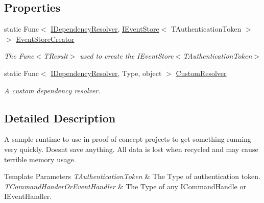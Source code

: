 \subsection*{Properties}
\begin{DoxyCompactItemize}
\item 
static Func$<$ \hyperlink{interfaceCqrs_1_1Configuration_1_1IDependencyResolver}{I\+Dependency\+Resolver}, \hyperlink{interfaceCqrs_1_1Events_1_1IEventStore}{I\+Event\+Store}$<$ T\+Authentication\+Token $>$ $>$ \hyperlink{classCqrs_1_1Configuration_1_1SampleRuntime_a9038dd478bcafb2f5f65cbcbada712db_a9038dd478bcafb2f5f65cbcbada712db}{Event\+Store\+Creator}
\begin{DoxyCompactList}\small\item\em The Func$<$\+T\+Result$>$ used to create the I\+Event\+Store$<$\+T\+Authentication\+Token$>$ \end{DoxyCompactList}\item 
static Func$<$ \hyperlink{interfaceCqrs_1_1Configuration_1_1IDependencyResolver}{I\+Dependency\+Resolver}, Type, object $>$ \hyperlink{classCqrs_1_1Configuration_1_1SampleRuntime_abf9adc15d9a99c70ab60792c37a619f0_abf9adc15d9a99c70ab60792c37a619f0}{Custom\+Resolver}
\begin{DoxyCompactList}\small\item\em A custom dependency resolver. \end{DoxyCompactList}\end{DoxyCompactItemize}


\subsection{Detailed Description}
A sample runtime to use in proof of concept projects to get something running very quickly. Doesn\textquotesingle{}t save anything. All data is lost when recycled and may cause terrible memory usage. 


\begin{DoxyTemplParams}{Template Parameters}
{\em T\+Authentication\+Token} & The Type of authentication token.\\
\hline
{\em T\+Command\+Hander\+Or\+Event\+Handler} & The Type of any I\+Command\+Handle or I\+Event\+Handler.\\
\hline
\end{DoxyTemplParams}


